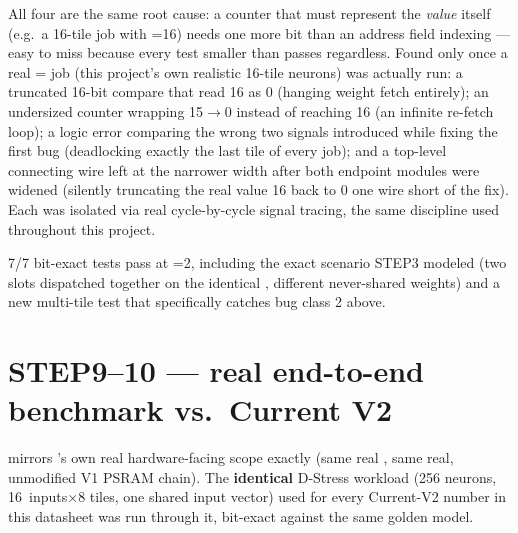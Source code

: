 \begin{fnwarn}
All four are the same root cause: a counter that must represent the
\emph{value}  itself (e.g.\ a 16-tile job with
=16) needs one more bit than an address field
indexing  --- easy to miss because every test
smaller than  passes regardless. Found only once a
real = job (this project's own
realistic 16-tile neurons) was actually run: a truncated 16-bit
compare that read 16 as 0 (hanging weight fetch entirely); an
undersized counter wrapping 15$\to$0 instead of reaching 16 (an
infinite re-fetch loop); a logic error comparing the wrong two signals
introduced while fixing the first bug (deadlocking exactly the last
tile of every job); and a top-level connecting wire left at the
narrower width after both endpoint modules were widened (silently
truncating the real value 16 back to 0 one wire short of the fix).
Each was isolated via real cycle-by-cycle signal tracing, the same
discipline used throughout this project.
\end{fnwarn}

7/7 bit-exact tests pass at =2, including the exact
scenario STEP3 modeled (two slots dispatched together on the identical
, different never-shared weights) and a new
multi-tile test that specifically catches bug class 2 above.

\section{STEP9--10 --- real end-to-end benchmark vs.\ Current V2}
\label{sec:nmscompare}
 mirrors
's own real hardware-facing scope
exactly (same real , same real,
unmodified V1 PSRAM chain). The \textbf{identical} D-Stress workload
(256 neurons, 16~inputs$\times$8 tiles, one shared input vector) used
for every Current-V2 number in this datasheet was run through it,
bit-exact against the same golden model.

